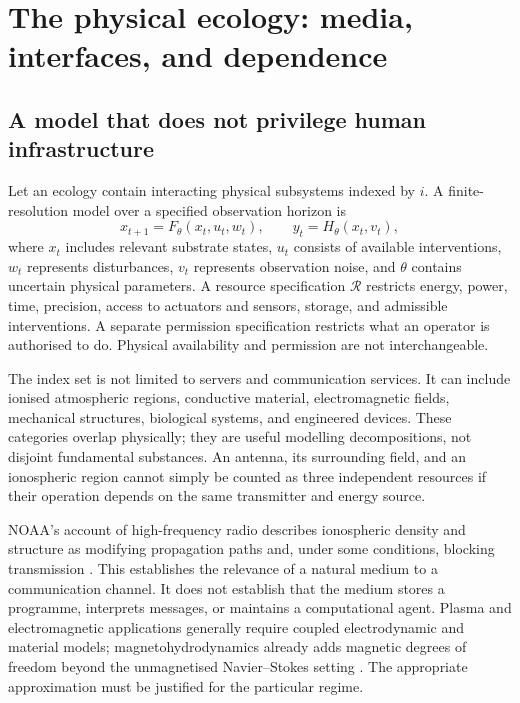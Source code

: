 \documentclass[11pt,a4paper]{article}
\theoremstyle{definition}
\theoremstyle{remark}
\newcommand{\calR}{\mathcal{R}}
\begin{document}
\section{The physical ecology: media, interfaces, and dependence}\label{sec:ecology}
\subsection{A model that does not privilege human infrastructure}
Let an ecology contain interacting physical subsystems indexed by $i$. A finite-resolution model over a specified observation horizon is
\begin{equation}\label{eq:ecology}
 x_{t+1}=F_\theta(x_t,u_t,w_t),\qquad y_t=H_\theta(x_t,v_t),
\end{equation}
where $x_t$ includes relevant substrate states, $u_t$ consists of available interventions, $w_t$ represents disturbances, $v_t$ represents observation noise, and $\theta$ contains uncertain physical parameters. A resource specification $\calR$ restricts energy, power, time, precision, access to actuators and sensors, storage, and admissible interventions. A separate permission specification restricts what an operator is authorised to do. Physical availability and permission are not interchangeable.

The index set is not limited to servers and communication services. It can include ionised atmospheric regions, conductive material, electromagnetic fields, mechanical structures, biological systems, and engineered devices. These categories overlap physically; they are useful modelling decompositions, not disjoint fundamental substances. An antenna, its surrounding field, and an ionospheric region cannot simply be counted as three independent resources if their operation depends on the same transmitter and energy source.

NOAA's account of high-frequency radio describes ionospheric density and structure as modifying propagation paths and, under some conditions, blocking transmission \citep{noaa}. This establishes the relevance of a natural medium to a communication channel. It does not establish that the medium stores a programme, interprets messages, or maintains a computational agent. Plasma and electromagnetic applications generally require coupled electrodynamic and material models; magnetohydrodynamics already adds magnetic degrees of freedom beyond the unmagnetised Navier--Stokes setting \citep{lei}. The appropriate approximation must be justified for the particular regime.
\end{document}
